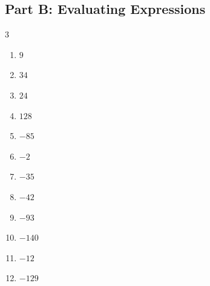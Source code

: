 \documentclass[11pt]{article}
\begin{document}
\subsection*{Part B: Evaluating Expressions}
\begin{multicols}{3}
\begin{enumerate}
  \item $9$
  \item $34$
  \item $24$
  \item $128$
  \item $-85$
  \item $-2$
  \item $-35$
  \item $-42$
  \item $-93$
  \item $-140$
  \item $-12$
  \item $-129$
\end{enumerate}
\end{multicols}
\end{document}
